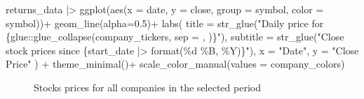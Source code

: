 \documentclass[
  letterpaper,
  DIV=11,
  numbers=noendperiod]{scrreprt}
\newenvironment{Shaded}{\begin{snugshade}}{\end{snugshade}}
\newcommand{\AttributeTok}[1]{\textcolor[rgb]{0.40,0.45,0.13}{#1}}
\newcommand{\FloatTok}[1]{\textcolor[rgb]{0.68,0.00,0.00}{#1}}
\newcommand{\FunctionTok}[1]{\textcolor[rgb]{0.28,0.35,0.67}{#1}}
\newcommand{\NormalTok}[1]{\textcolor[rgb]{0.00,0.23,0.31}{#1}}
\newcommand{\SpecialCharTok}[1]{\textcolor[rgb]{0.37,0.37,0.37}{#1}}
\newcommand{\StringTok}[1]{\textcolor[rgb]{0.13,0.47,0.30}{#1}}
\theoremstyle{definition}
\theoremstyle{remark}
\begin{document}
\begin{Shaded}
\begin{Highlighting}[]
\NormalTok{returns\_data }\SpecialCharTok{|\textgreater{}} 
  \FunctionTok{ggplot}\NormalTok{(}\FunctionTok{aes}\NormalTok{(}\AttributeTok{x =}\NormalTok{ date, }\AttributeTok{y =}\NormalTok{ close,  }\AttributeTok{group =}\NormalTok{ symbol, }\AttributeTok{color =}\NormalTok{ symbol))}\SpecialCharTok{+}
  \FunctionTok{geom\_line}\NormalTok{(}\AttributeTok{alpha=}\FloatTok{0.5}\NormalTok{)}\SpecialCharTok{+}
  \FunctionTok{labs}\NormalTok{(}
    \AttributeTok{title =} \FunctionTok{str\_glue}\NormalTok{(}\StringTok{"Daily price for \{glue::glue\_collapse(company\_tickers, sep = \textquotesingle{}, \textquotesingle{})\}"}\NormalTok{), }
    \AttributeTok{subtitle =} \FunctionTok{str\_glue}\NormalTok{(}\StringTok{"Close stock prices since \{start\_date |\textgreater{} format(\textquotesingle{}\%d \%B, \%Y\textquotesingle{})\}"}\NormalTok{),}
    \AttributeTok{x =} \StringTok{"Date"}\NormalTok{,}
    \AttributeTok{y =} \StringTok{"Close Price"}
\NormalTok{    ) }\SpecialCharTok{+} 
  \FunctionTok{theme\_minimal}\NormalTok{()}\SpecialCharTok{+}
  \FunctionTok{scale\_color\_manual}\NormalTok{(}\AttributeTok{values =}\NormalTok{ company\_colors)}
\end{Highlighting}
\end{Shaded}

\begin{figure}[H]


\caption{\label{fig-all-stocks}Stocks prices for all companies in the
selected period}

\end{figure}%
\end{document}
